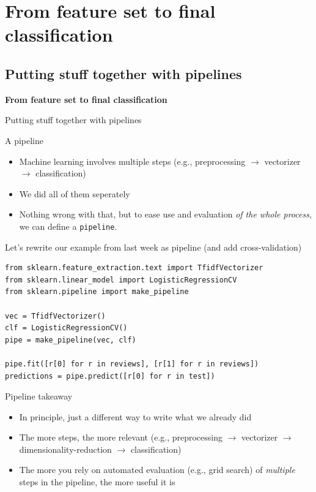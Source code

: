 \documentclass{beamer}
\begin{document}
\section{From feature set to final classification}

\subsection{Putting stuff together with pipelines}
\begin{frame}[plain]
\textbf{From feature set to final classification}

Putting stuff together with pipelines
\end{frame}

\begin{frame}{A pipeline}
\begin{itemize}
\item Machine learning involves multiple steps (e.g., preprocessing $\rightarrow$ vectorizer $\rightarrow$ classification)
\item We did all of them seperately
\item Nothing wrong with that, but to ease use and evaluation \emph{of the whole process}, we can define a \texttt{pipeline}.
\end{itemize}

\end{frame}

\begin{frame}[fragile]{Let's rewrite our example from last week as pipeline (and add cross-validation)}
\begin{lstlisting}
from sklearn.feature_extraction.text import TfidfVectorizer
from sklearn.linear_model import LogisticRegressionCV
from sklearn.pipeline import make_pipeline

vec = TfidfVectorizer()
clf = LogisticRegressionCV()
pipe = make_pipeline(vec, clf)

pipe.fit([r[0] for r in reviews], [r[1] for r in reviews])
predictions = pipe.predict([r[0] for r in test])
\end{lstlisting}
\end{frame}

\begin{frame}{Pipeline takeaway}
\begin{itemize}
\item In principle, just a different way to write what we already did
\item The more steps, the more relevant (e.g., preprocessing $\rightarrow$ vectorizer $\rightarrow$ dimensionality-reduction $\rightarrow$ classification)
\item The more you rely on automated evaluation (e.g., grid search) of \emph{multiple} steps in the pipeline, the more useful it is
\end{itemize}
\end{frame}
\end{document}
